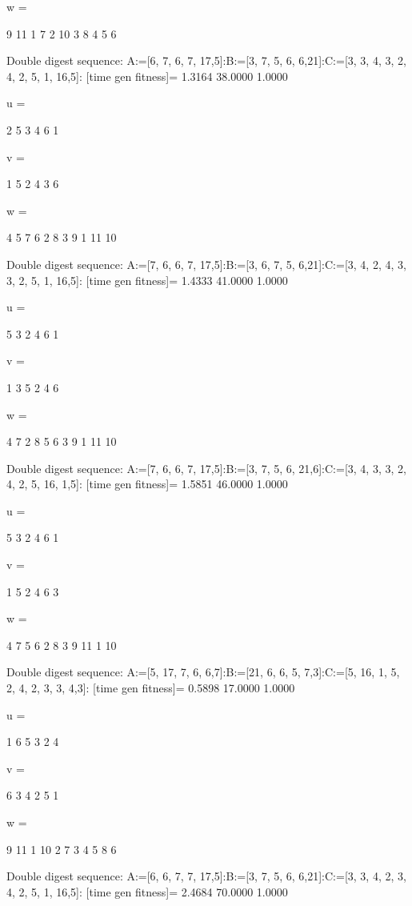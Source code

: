 w =

     9    11     1     7     2    10     3     8     4     5     6

Double digest sequence:
A:=[6, 7, 6, 7, 17,5]:B:=[3, 7, 5, 6, 6,21]:C:=[3, 3, 4, 3, 2, 4, 2, 5, 1, 16,5]:
[time gen fitness]=
    1.3164   38.0000    1.0000


u =

     2     5     3     4     6     1


v =

     1     5     2     4     3     6


w =

     4     5     7     6     2     8     3     9     1    11    10

Double digest sequence:
A:=[7, 6, 6, 7, 17,5]:B:=[3, 6, 7, 5, 6,21]:C:=[3, 4, 2, 4, 3, 3, 2, 5, 1, 16,5]:
[time gen fitness]=
    1.4333   41.0000    1.0000


u =

     5     3     2     4     6     1


v =

     1     3     5     2     4     6


w =

     4     7     2     8     5     6     3     9     1    11    10

Double digest sequence:
A:=[7, 6, 6, 7, 17,5]:B:=[3, 7, 5, 6, 21,6]:C:=[3, 4, 3, 3, 2, 4, 2, 5, 16, 1,5]:
[time gen fitness]=
    1.5851   46.0000    1.0000


u =

     5     3     2     4     6     1


v =

     1     5     2     4     6     3


w =

     4     7     5     6     2     8     3     9    11     1    10

Double digest sequence:
A:=[5, 17, 7, 6, 6,7]:B:=[21, 6, 6, 5, 7,3]:C:=[5, 16, 1, 5, 2, 4, 2, 3, 3, 4,3]:
[time gen fitness]=
    0.5898   17.0000    1.0000


u =

     1     6     5     3     2     4


v =

     6     3     4     2     5     1


w =

     9    11     1    10     2     7     3     4     5     8     6

Double digest sequence:
A:=[6, 6, 7, 7, 17,5]:B:=[3, 7, 5, 6, 6,21]:C:=[3, 3, 4, 2, 3, 4, 2, 5, 1, 16,5]:
[time gen fitness]=
    2.4684   70.0000    1.0000


